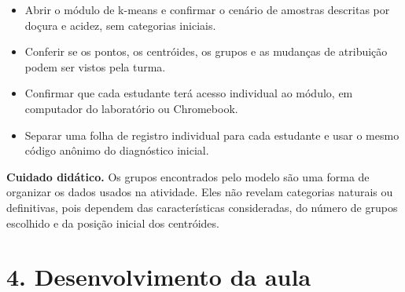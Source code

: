 \documentclass[12pt,a4paper]{article}
\newcommand{\bloco}[1]{%
  \vspace{0.25em}
  \noindent\colorbox{cinza}{\parbox{0.96\linewidth}{#1}}%
  \vspace{0.3em}
}
\begin{document}
\begin{itemize}
  \item Abrir o módulo de k-means e confirmar o cenário de amostras descritas por doçura e acidez, sem categorias iniciais.
  \item Conferir se os pontos, os centróides, os grupos e as mudanças de atribuição podem ser vistos pela turma.
  \item Confirmar que cada estudante terá acesso individual ao módulo, em computador do laboratório ou Chromebook.
  \item Separar uma folha de registro individual para cada estudante e usar o mesmo código anônimo do diagnóstico inicial.
\end{itemize}

\bloco{\textbf{Cuidado didático.} Os grupos encontrados pelo modelo são uma forma de organizar os dados usados na atividade. Eles não revelam categorias naturais ou definitivas, pois dependem das características consideradas, do número de grupos escolhido e da posição inicial dos centróides.}

\section*{4. Desenvolvimento da aula}
\end{document}
